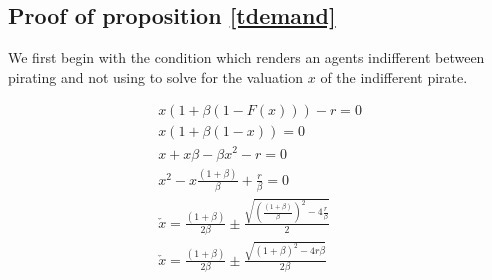 

\subsection{Proof of proposition \ref{tdemand}}

\label{tdemandp}

We first begin with the condition which renders an agents indifferent between pirating and not using to solve for the valuation $x$ of the indifferent pirate. 


\begin{align*}
x(1+\beta(1-F(x)))-r=0 \\
x(1+\beta(1-x))=0 \\
x+x\beta-\beta x^2-r=0 \\
x^2-x\frac{(1+\beta)}{\beta} +\frac{r}{\beta} = 0 \\
\check{x} = \frac{(1+\beta)}{2 \beta}
\pm
\frac{ \sqrt{ \left(\frac{(1+\beta)}{\beta}\right)^2 -4\frac{r}{\beta} } }{2} \\
\check{x} = \frac{(1+\beta)}{2 \beta}
\pm
\frac{ \sqrt{ \left(1+\beta\right)^2 -4r\beta } }{2 \beta} \\
\end{align*}



